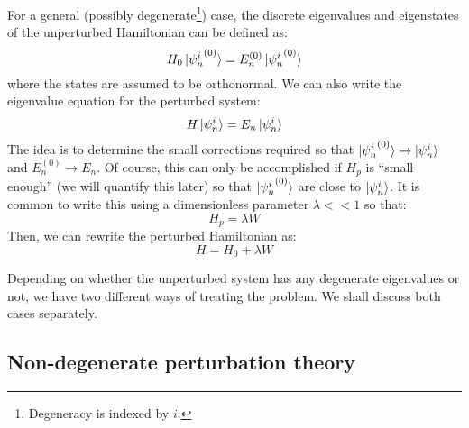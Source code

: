 For a general (possibly degenerate\footnote{Degeneracy is indexed by $i$.}) case, the discrete eigenvalues and eigenstates of the unperturbed Hamiltonian can be defined as:
\begin{equation}
    H_0 \ket{{\psi_n^i}^{(0)}} = E_n^{(0)} \ket{{\psi_n^i}^{(0)}} 
\end{equation}
where the states are assumed to be orthonormal. We can also write the eigenvalue equation for the perturbed system:
\begin{equation}
    H \ket{\psi_n^i} = E_n\ket{\psi_n^i} 
\end{equation}
The idea is to determine the small corrections required so that $\ket{{\psi_n^i}^{(0)}}\to \ket{\psi_n^i}$ and $E_n^{(0)}\to E_n$. Of course, this can only be accomplished if $H_p$ is ``small enough'' (we will quantify this later) so that $\ket{{\psi_n^i}^{(0)}}$ are close to $\ket{\psi_n^i}$. It is common to write this using a dimensionless parameter $\lambda << 1$ so that:
\begin{equation}
    H_p = \lambda W
\end{equation}
Then, we can rewrite the perturbed Hamiltonian as:
\begin{equation}
    H = H_0 + \lambda W
\end{equation}

Depending on whether the unperturbed system has any degenerate eigenvalues or not, we have two different ways of treating the problem. We shall discuss both cases separately.

\subsection{Non-degenerate perturbation theory}


